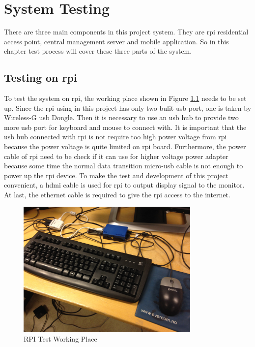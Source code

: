 \chapter{System Testing}
\label{chp:system_test}
\par There are three main components in this project system. They are \gls{rpi} residential access point, central management server and mobile application. So in this chapter test process will cover these three parts of the system.

\section{Testing on \gls{rpi}}
\par To test the system on \gls{rpi}, the working place shown in Figure \ref{fig:rpi_test} needs to be set up. Since the \gls{rpi} using in this project has only two bulit \gls{usb} port, one is taken by Wireless-G \gls{usb} Dongle. Then it is necessary to use an \gls{usb} hub to provide two more \gls{usb} port for keyboard and mouse to connect with. It is important that the \gls{usb} hub connected with \gls{rpi} is not require too high power voltage from \gls{rpi} because the power voltage is quite limited on \gls{rpi} board. Furthermore, the power cable of \gls{rpi} need to be check if it can use for higher voltage power adapter because some time the normal data transition micro-usb cable is not enough to power up the \gls{rpi} device. To make the test and development of this project convenient, a \gls{hdmi} cable is used for \gls{rpi} to output display signal to the monitor. At last, the ethernet cable is required to give the \gls{rpi} access to the internet.

\begin{figure}
	\centering
    	\includegraphics[width=0.80\textwidth,natwidth=610,natheight=642]{figs/rpi_test.JPG}
  	\caption{RPI Test Working Place}
  	\label{fig:rpi_test}
\end{figure}

